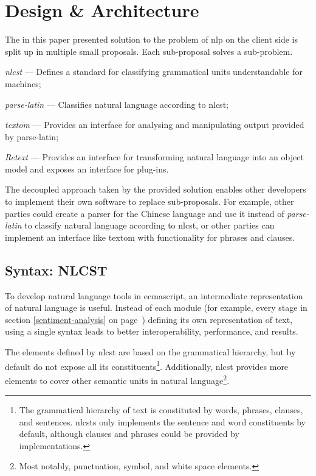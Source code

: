\chapter{Design \& Architecture}\label{design}

The in this paper presented solution to the problem of \gls{nlp} on the
client side is split up in multiple small proposals. Each sub-proposal
solves a sub-problem.

\begin{aenumerate}
\item\emph{\acrshort{nlcst}} --- Defines a standard for classifying
  grammatical units understandable for machines;
\item\emph{parse-latin} --- Classifies natural language according to
  \gls{nlcst};
\item\emph{\gls{textom}} --- Provides an interface for analysing and
  manipulating output provided by parse-latin;
\item\emph{Retext} --- Provides an interface for transforming natural
  language into an object model and exposes an interface for plug-ins.
\end{aenumerate}

\noindent The decoupled approach taken by the provided solution enables other
  developers to implement their own software to replace sub-proposals.
For example, other parties could create a parser for the Chinese language and
  use it instead of \emph{parse-latin} to classify natural language according
  to \gls{nlcst}, or other parties can implement an interface like
  \gls{textom} with functionality for phrases and clauses.

\section{Syntax: NLCST}\label{syntax}

To develop natural language tools in \gls{ecmascript}, an intermediate
  representation of natural language is useful.
Instead of each module (for example, every stage in section
  \ref{sentiment-analysis} on page~\pageref{apendix-a-nlcst-definition})
  defining its own representation of text, using a single syntax leads to
  better interoperability, performance, and results.

The elements defined by \acrfull{nlcst} are based on the grammatical
  hierarchy, but by default do not expose all its constituents\footnote{The
      grammatical hierarchy of text is constituted by words, phrases,
      clauses, and sentences.
    \glspl{nlcst} only implements the sentence and word constituents
    by default, although clauses and phrases could be provided by
    implementations.}.
Additionally, \gls{nlcst} provides more elements to cover other semantic
  units in natural language\footnote{Most
    notably, punctuation, symbol, and white space elements.}.

